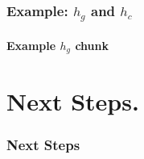 \documentclass{beamer}
\begin{document}

\begin{frame}

\frametitle{Example: $h_g$ and $h_c$}

\framesubtitle{Example $h_g$ chunk}
\lstset{basicstyle = \footnotesize}


\end{frame}


\section[Next Steps]{Next Steps.}


\begin{frame}

\frametitle{Next Steps}

\end{frame}

\end{document}

